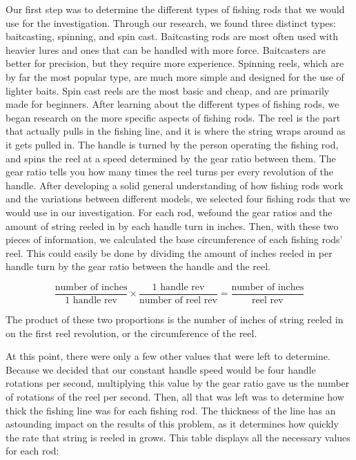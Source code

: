 Our first step was to determine the different types of fishing rods that we would use for the investigation. Through our research, we found three distinct types: baitcasting, spinning, and spin cast. Baitcasting rods are most often used with heavier lures and ones that can be handled with more force. Baitcasters are better for precision, but they require more experience. Spinning reels, which are by far the most popular type, are much more simple and designed for the use of lighter baits. Spin cast reels are the most basic and cheap, and are primarily made for beginners. After learning about the different types of fishing rods, we began research on the more specific aspects of fishing rods. The reel is the part that actually pulls in the fishing line, and it is where the string wraps around as it gets pulled in. The handle is turned by the person operating the fishing rod, and spins the reel at a speed determined by the gear ratio between them. The gear ratio tells you how many times the reel turns per every revolution of the handle. After developing a solid general understanding of how fishing rods work and the variations between different models, we selected four fishing rods that we would use in our investigation. For each rod, wefound the gear ratios and the amount of string reeled in by each handle turn in inches. Then, with these two pieces of information, we calculated the base circumference of each fishing rods’ reel. This could easily be done by dividing the amount of inches reeled in per handle turn by the gear ratio between the handle and the reel.

$$\frac{\text{number of inches}}{\text{1 handle rev}} \times \frac{\text{1 handle rev}}{\text{number of reel rev}} = \frac{\text{number of inches}}{\text{reel rev}}
$$

The product of these two proportions is the number of inches of string reeled in on the first reel revolution, or the circumference of the reel.

At this point, there were only a few other values that were left to determine. Because we decided that our constant handle speed would be four handle rotations per second, multiplying this value by the gear ratio gave us the number of rotations of the reel per second. Then, all that was left was to determine how thick the fishing line was for each fishing rod. The thickness of the line has an astounding impact on the results of this problem, as it determines how quickly the rate that string is reeled in grows. This table displays all the necessary values for each rod:





